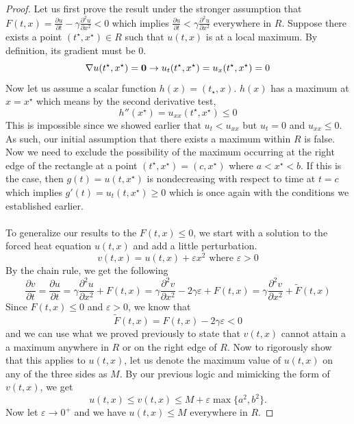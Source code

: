 \documentclass{article}
\newcommand{\pd}[2]{\frac{\partial #1}{\partial #2}}
\newcommand{\pdt}[2]{\frac{\partial ^2 #1}{\partial #2 ^2}}
\theoremstyle{definition}
\begin{document}
\begin{proof}
    Let us first prove the result under the stronger assumption that $F(t,x) = \pd{u}{t} -\gamma \pdt{u}{x} <0$ which implies $\pd{u}{t} < \gamma \pdt{u}{x}$ everywhere in $R$. Suppose there exists a point $(t^\star, x^\star) \in R$ such that $u(t,x)$ is at a local maximum. By definition, its gradient must be 0.
    \begin{equation*}
        \nabla u(t^\star, x^\star ) = \bold{0} \rightarrow u_t(t^\star,x^\star) = u_{x}(t^\star, x^\star) = 0
    \end{equation*}
    Now let us assume a scalar function $h(x) = (t_\star, x)$. $h(x)$ has a maximum at $x=x^\star$ which means by the second derivative test,
    \begin{equation*}
        h''(x^\star) = u_{xx}(t^\star, x^\star) \leq 0
    \end{equation*}
    This is impossible since we showed earlier that $u_t < u_{xx}$ but $u_t = 0$ and $u_{xx} \leq 0$. As such, our initial assumption that there exists a maximum within $R$ is false. Now we need to exclude the possibility of the maximum occurring at the right edge of the rectangle at a point $(t^\star,x^\star) = (c,x^\star)$ where $a<x^\star < b$. If this is the case, then $g(t) =u(t,x^\star)$ is nondecreasing with respect to time at $t=c$ which implies $g'(t) = u_t(t,x^\star) \geq 0$ which is once again with the conditions we established earlier. \\\\
    To generalize our results to the $F(t,x) \leq 0$, we start with a solution to the forced heat equation $u(t,x)$ and add a little perturbation.
    \begin{equation*}
        v(t,x) = u(t,x) + \varepsilon x^2 \text{ where } \varepsilon>0
    \end{equation*}
    By the chain rule, we get the following 
    \begin{equation*}
        \pd{v}{t} = \pd{u}{t} =\gamma \pdt{u}{x}+F(t,x) = \gamma \pdt{v}{x} -2\gamma \varepsilon+F(t,x) = \gamma \pdt{v}{x} +\tilde{F}(t,x)
    \end{equation*}
    Since $F(t,x) \leq 0$ and $\varepsilon>0$, we know that 
    \begin{equation*}
        \tilde{F}(t,x) = F(t,x) -2\gamma\varepsilon <0
    \end{equation*}
    and we can use what we proved previously to state that $v(t,x)$ cannot attain a a maximum anywhere in $R$ or on the right edge of $R$. Now to rigorously show that this applies to $u(t,x)$, let us denote the maximum value of $u(t,x)$ on any of the three sides as $M$. By our previous logic and mimicking the form of $v(t,x)$, we get
    \begin{equation*}
    u(t,x) \leq v(t,x) \leq M+\varepsilon \max \{a^2,b^2 \}.
    \end{equation*}
    Now let $\varepsilon\rightarrow 0^+$ and we have $u(t,x) \leq M$ everywhere in $R$.
    
\end{proof}
\end{document}
